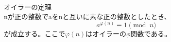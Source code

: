 \documentclass[fleqn,leqno,autodetect-engine,dvipdfmxi-if-dvi,ja=standard]{bxjsarticle}
\begin{document}
オイラーの定理\\

nが正の整数でaをnと互いに素な正の整数としたとき、
\begin{displaymath}
a^{\varphi (n)} \equiv 1 \pmod{n}
\end{displaymath}
が成立する。ここで$\varphi (n)$はオイラーの$ \phi $関数である。
\end{document}
